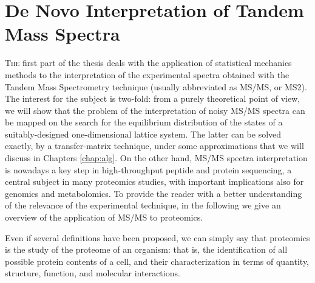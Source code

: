 \part{De Novo Interpretation of Tandem Mass Spectra}


\thispagestyle{plain}

\lettrine{T}{he} first part of the thesis deals with the application of
statistical mechanics methods to the interpretation of the experimental spectra
obtained with the Tandem Mass Spectrometry technique (usually abbreviated as
MS/MS, or MS2). The interest for the subject is two-fold: from a purely
theoretical point of view, we will show that the problem of the interpretation
of noisy MS/MS spectra can be mapped on the search for the equilibrium
distribution of the states of a suitably-designed one-dimensional lattice
system. The latter can be solved exactly, by a transfer-matrix technique, under
some approximations that we will discuss in Chapters \ref{chap:alg}. 
On the other hand, MS/MS spectra interpretation is nowadays  a key step 
in high-throughput peptide and protein sequencing, a central subject in many
proteomics studies, with important implications also for genomics and
metabolomics.  To provide  the reader with a better understanding of the
relevance of the experimental technique, in the following we give an overview of
the application of MS/MS to proteomics.

Even if several definitions have been proposed, we can simply say that
proteomics is the study of the proteome of an organism: that is, the
identification of all possible protein contents of a cell, and their
characterization in terms of quantity, structure, function, and molecular
interactions. 

